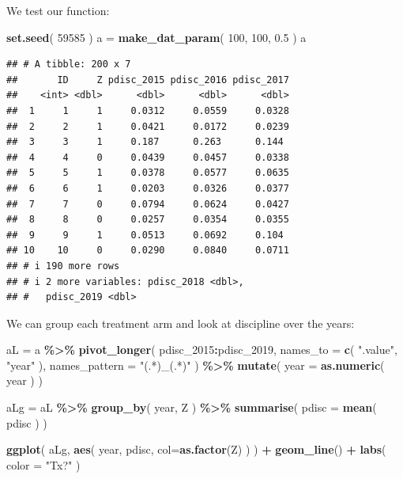 \documentclass[
]{book}
\newenvironment{Shaded}{\begin{snugshade}}{\end{snugshade}}
\newcommand{\AttributeTok}[1]{\textcolor[rgb]{0.13,0.29,0.53}{#1}}
\newcommand{\DecValTok}[1]{\textcolor[rgb]{0.00,0.00,0.81}{#1}}
\newcommand{\FloatTok}[1]{\textcolor[rgb]{0.00,0.00,0.81}{#1}}
\newcommand{\FunctionTok}[1]{\textcolor[rgb]{0.13,0.29,0.53}{\textbf{#1}}}
\newcommand{\NormalTok}[1]{#1}
\newcommand{\OtherTok}[1]{\textcolor[rgb]{0.56,0.35,0.01}{#1}}
\newcommand{\SpecialCharTok}[1]{\textcolor[rgb]{0.81,0.36,0.00}{\textbf{#1}}}
\newcommand{\StringTok}[1]{\textcolor[rgb]{0.31,0.60,0.02}{#1}}
\begin{document}
We test our function:

\begin{Shaded}
\begin{Highlighting}[]
\FunctionTok{set.seed}\NormalTok{( }\DecValTok{59585}\NormalTok{ )}
\NormalTok{a }\OtherTok{=} \FunctionTok{make\_dat\_param}\NormalTok{( }\DecValTok{100}\NormalTok{, }\DecValTok{100}\NormalTok{, }\FloatTok{0.5}\NormalTok{ )  }
\NormalTok{a}
\end{Highlighting}
\end{Shaded}

\begin{verbatim}
## # A tibble: 200 x 7
##       ID     Z pdisc_2015 pdisc_2016 pdisc_2017
##    <int> <dbl>      <dbl>      <dbl>      <dbl>
##  1     1     1     0.0312     0.0559     0.0328
##  2     2     1     0.0421     0.0172     0.0239
##  3     3     1     0.187      0.263      0.144 
##  4     4     0     0.0439     0.0457     0.0338
##  5     5     1     0.0378     0.0577     0.0635
##  6     6     1     0.0203     0.0326     0.0377
##  7     7     0     0.0794     0.0624     0.0427
##  8     8     0     0.0257     0.0354     0.0355
##  9     9     1     0.0513     0.0692     0.104 
## 10    10     0     0.0290     0.0840     0.0711
## # i 190 more rows
## # i 2 more variables: pdisc_2018 <dbl>,
## #   pdisc_2019 <dbl>
\end{verbatim}

We can group each treatment arm and look at discipline over the years:

\begin{Shaded}
\begin{Highlighting}[]
\NormalTok{aL }\OtherTok{=}\NormalTok{ a }\SpecialCharTok{\%\textgreater{}\%} 
  \FunctionTok{pivot\_longer}\NormalTok{( pdisc\_2015}\SpecialCharTok{:}\NormalTok{pdisc\_2019, }
                \AttributeTok{names\_to =} \FunctionTok{c}\NormalTok{( }\StringTok{".value"}\NormalTok{, }\StringTok{"year"}\NormalTok{ ),}
                \AttributeTok{names\_pattern =} \StringTok{"(.*)\_(.*)"}\NormalTok{ ) }\SpecialCharTok{\%\textgreater{}\%}
  \FunctionTok{mutate}\NormalTok{( }\AttributeTok{year =} \FunctionTok{as.numeric}\NormalTok{( year ) )}

\NormalTok{aLg }\OtherTok{=}\NormalTok{ aL }\SpecialCharTok{\%\textgreater{}\%} \FunctionTok{group\_by}\NormalTok{( year, Z ) }\SpecialCharTok{\%\textgreater{}\%}
  \FunctionTok{summarise}\NormalTok{( }\AttributeTok{pdisc =} \FunctionTok{mean}\NormalTok{( pdisc ) )}

\FunctionTok{ggplot}\NormalTok{( aLg, }\FunctionTok{aes}\NormalTok{( year, pdisc, }\AttributeTok{col=}\FunctionTok{as.factor}\NormalTok{(Z) ) ) }\SpecialCharTok{+}
  \FunctionTok{geom\_line}\NormalTok{() }\SpecialCharTok{+}
  \FunctionTok{labs}\NormalTok{( }\AttributeTok{color =} \StringTok{"Tx?"}\NormalTok{ )}
\end{Highlighting}
\end{Shaded}
\end{document}
